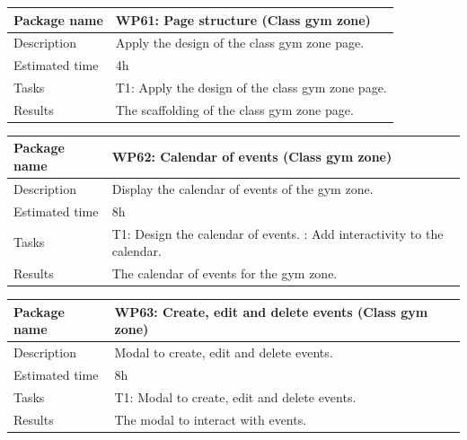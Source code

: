 \documentclass[a4paper, 12pt, oneside]{book}
\begin{document}
\vspace*{16pt}
\begin{tabularx}{\textwidth}{| l | X |}
	\hline
	\rowcolor{rowColor}
	{\semibf Package name}   & {\semibf WP61}: Page structure (Class gym zone)            \\
	\hline
	{\semibf Description}    & Apply the design of the class gym zone page.               \\
	\hline
	\rowcolor{rowColor}
	{\semibf Estimated time} & 4h                                                         \\
	\hline
	{\semibf Tasks}          & {\semibf T1}: Apply the design of the class gym zone page. \\
	\hline
	\rowcolor{rowColor}
	{\semibf Results}        & The scaffolding of the class gym zone page.                \\
	\hline
\end{tabularx}
\vspace*{16pt}
\begin{tabularx}{\textwidth}{| l | X |}
	\hline
	\rowcolor{rowColor}
	{\semibf Package name}   & {\semibf WP62}: Calendar of events (Class gym zone) \\
	\hline
	{\semibf Description}    & Display the calendar of events of the gym zone.     \\
	\hline
	\rowcolor{rowColor}
	{\semibf Estimated time} & 8h                                                  \\
	\hline
	{\semibf Tasks}          & {\semibf T1}: Design the calendar of events.
	\newline {\semibf T2}: Add interactivity to the calendar.                      \\
	\hline
	\rowcolor{rowColor}
	{\semibf Results}        & The calendar of events for the gym zone.            \\
	\hline
\end{tabularx}
\vspace*{16pt}
\begin{tabularx}{\textwidth}{| l | X |}
	\hline
	\rowcolor{rowColor}
	{\semibf Package name}   & {\semibf WP63}: Create, edit and delete events (Class gym zone) \\
	\hline
	{\semibf Description}    & Modal to create, edit and delete events.                        \\
	\hline
	\rowcolor{rowColor}
	{\semibf Estimated time} & 8h                                                              \\
	\hline
	{\semibf Tasks}          & {\semibf T1}: Modal to create, edit and delete events.          \\
	\hline
	\rowcolor{rowColor}
	{\semibf Results}        & The modal to interact with events.                              \\
	\hline
\end{tabularx}
\end{document}
